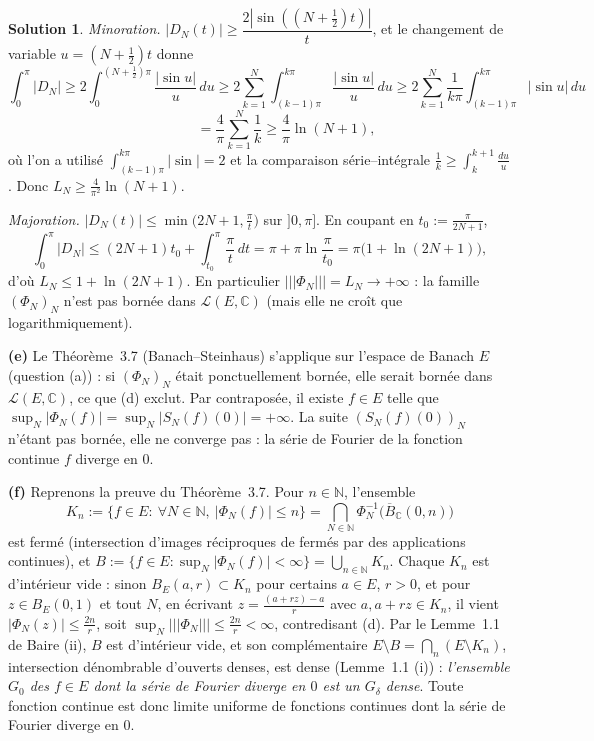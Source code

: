 \documentclass[11pt,a4paper]{article}
\newcommand{\N}{\mathbb{N}}
\newcommand{\C}{\mathbb{C}}
\newcommand{\opnorm}[1]{|\!|\!|#1|\!|\!|}
\newcommand{\Lc}{\mathcal{L}}
\theoremstyle{definition}
\newtheorem*{solution}{Solution}
\begin{document}
\begin{solution}
\emph{Minoration.} $|D_N(t)|\ge\dfrac{2|\sin((N+\frac12)t)|}{t}$, et le changement de variable $u=(N+\frac12)t$ donne
\[
\int_0^\pi|D_N|\ge2\int_0^{(N+\frac12)\pi}\frac{|\sin u|}{u}\,du
\ge2\sum_{k=1}^N\int_{(k-1)\pi}^{k\pi}\frac{|\sin u|}{u}\,du
\ge2\sum_{k=1}^N\frac1{k\pi}\int_{(k-1)\pi}^{k\pi}|\sin u|\,du
\]
\[
\phantom{\int_0^\pi|D_N|}=\frac4\pi\sum_{k=1}^N\frac1k\ge\frac4\pi\ln(N+1),
\]
où l'on a utilisé $\int_{(k-1)\pi}^{k\pi}|\sin|=2$ et la comparaison série--intégrale $\frac1k\ge\int_k^{k+1}\frac{du}u$. Donc $L_N\ge\frac4{\pi^2}\ln(N+1)$.

\emph{Majoration.} $|D_N(t)|\le\min\big(2N+1,\frac\pi t\big)$ sur $]0,\pi]$. En coupant en $t_0:=\frac\pi{2N+1}$,
\[
\int_0^\pi|D_N|\le(2N+1)t_0+\int_{t_0}^\pi\frac\pi t\,dt=\pi+\pi\ln\frac\pi{t_0}=\pi\big(1+\ln(2N+1)\big),
\]
d'où $L_N\le1+\ln(2N+1)$. En particulier $\opnorm{\Phi_N}=L_N\to+\infty$ : la famille $(\Phi_N)_N$ n'est pas bornée dans $\Lc(E,\C)$ (mais elle ne croît que logarithmiquement).

\medskip
\noindent\textbf{(e)} Le Théorème~3.7 (Banach--Steinhaus) s'applique sur l'espace de Banach $E$ (question (a)) : si $(\Phi_N)_N$ était ponctuellement bornée, elle serait bornée dans $\Lc(E,\C)$, ce que (d) exclut. Par contraposée, il existe $f\in E$ telle que $\sup_N|\Phi_N(f)|=\sup_N|S_N(f)(0)|=+\infty$. La suite $(S_N(f)(0))_N$ n'étant pas bornée, elle ne converge pas : la série de Fourier de la fonction continue $f$ diverge en $0$.

\medskip
\noindent\textbf{(f)} Reprenons la preuve du Théorème~3.7. Pour $n\in\N$, l'ensemble
\[
K_n:=\{f\in E:\ \forall N\in\N,\ |\Phi_N(f)|\le n\}=\bigcap_{N\in\N}\Phi_N^{-1}\big(\overline{B}_\C(0,n)\big)
\]
est fermé (intersection d'images réciproques de fermés par des applications continues), et $B:=\{f\in E:\sup_N|\Phi_N(f)|<\infty\}=\bigcup_{n\in\N}K_n$. Chaque $K_n$ est d'intérieur vide : sinon $B_E(a,r)\subset K_n$ pour certains $a\in E$, $r>0$, et pour $z\in B_E(0,1)$ et tout $N$, en écrivant $z=\frac{(a+rz)-a}r$ avec $a,a+rz\in K_n$, il vient $|\Phi_N(z)|\le\frac{2n}r$, soit $\sup_N\opnorm{\Phi_N}\le\frac{2n}r<\infty$, contredisant (d). Par le Lemme~1.1 de Baire (ii), $B$ est d'intérieur vide, et son complémentaire $E\setminus B=\bigcap_n(E\setminus K_n)$, intersection dénombrable d'ouverts denses, est dense (Lemme~1.1 (i)) : \emph{l'ensemble $G_0$ des $f\in E$ dont la série de Fourier diverge en $0$ est un $G_\delta$ dense}. Toute fonction continue est donc limite uniforme de fonctions continues dont la série de Fourier diverge en $0$.


\end{solution}
\end{document}
